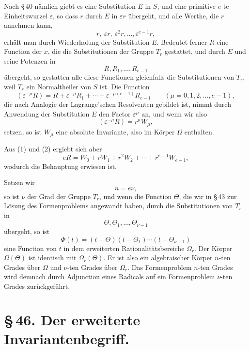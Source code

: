 \documentclass[11pt]{article}
\providecommand{\eps}{\varepsilon}
\providecommand{\eps}{\varepsilon}
\begin{document}
Nach \S\,40 nämlich giebt es eine Substitution $E$ in $S$, und eine primitive $e$-te Einheitswurzel $\eps$, so dass $r$ durch $E$ in $\eps r$ übergeht, und alle Werthe, die $r$ annehmen kann,
\[
 r,\ \eps r,\ \eps^2r,\ldots,\eps^{e-1}r,
\]
erhält man durch Wiederholung der Substitution $E$. Bedeutet ferner $R$ eine Function der $x$, die die Substitutionen der Gruppe $T_r$ gestattet, und durch $E$ und seine Potenzen in
\[
 R, R_1,\ldots,R_{e-1}
\]
übergeht, so gestatten alle diese Functionen gleichfalls die Substitutionen von $T_r$, weil $T_r$ ein Normaltheiler von $S$ ist. Die Function
\begin{equation}
(\eps^{-\mu}R)=R+\eps^{-\mu}R_1+\cdots+\eps^{-\mu(e-1)}R_{e-1}\qquad(\mu=0,1,2,\ldots,e-1),
\tag{1}
\end{equation}
die nach Analogie der Lagrange'schen Resolventen gebildet ist, nimmt durch Anwendung der Substitution $E$ den Factor $\eps^\mu$ an, und wenn wir also
\begin{equation}
(\eps^{-\mu}R)=r^\mu W_\mu,
\tag{2}
\end{equation}
setzen, so ist $W_\mu$ eine absolute Invariante, also im Körper $\Omega$ enthalten.

Aus (1) und (2) ergiebt sich aber
\begin{equation}
eR=W_0+rW_1+r^2W_2+\cdots+r^{e-1}W_{e-1},
\tag{3}
\end{equation}
wodurch die Behauptung erwiesen ist.

Setzen wir
\begin{equation}
n=e\nu,
\tag{4}
\end{equation}
so ist $\nu$ der Grad der Gruppe $T_r$, und wenn die Function $\Theta$, die wir in \S\,43 zur Lösung des Formenproblems angewandt haben, durch die Substitutionen von $T_r$ in
\[
\Theta,\Theta_1,\ldots,\Theta_{\nu-1}
\]
übergeht, so ist
\[
\Phi(t)=(t-\Theta)(t-\Theta_1)\cdots(t-\Theta_{\nu-1})
\]
eine Function von $t$ in dem erweiterten Rationalitätsbereiche $\Omega_r$. Der Körper $\Omega(\Theta)$ ist identisch mit $\Omega_r(\Theta)$. Er ist also ein algebraischer Körper $n$-ten Grades über $\Omega$ und $\nu$-ten Grades über $\Omega_r$. Das Formenproblem $n$-ten Grades wird demnach durch Adjunction eines Radicals auf ein Formenproblem $\nu$-ten Grades zurückgeführt.

\section*{\S\,46. Der erweiterte Invariantenbegriff.}
\end{document}
